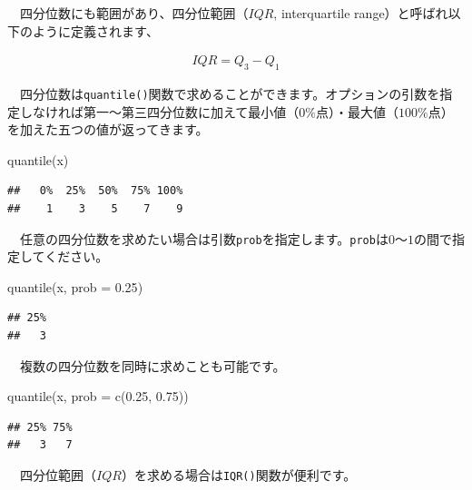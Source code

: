 \documentclass[
  12pt,
]{book}
\newenvironment{Shaded}{\begin{snugshade}}{\end{snugshade}}
\newcommand{\AttributeTok}[1]{\textcolor[rgb]{0.77,0.63,0.00}{#1}}
\newcommand{\FloatTok}[1]{\textcolor[rgb]{0.00,0.00,0.81}{#1}}
\newcommand{\FunctionTok}[1]{\textcolor[rgb]{0.00,0.00,0.00}{#1}}
\newcommand{\NormalTok}[1]{#1}
\begin{document}
　四分位数にも範囲があり、四分位範囲（\(IQR\), interquartile range）と呼ばれ以下のように定義されます、

\begin{align}
  IQR = Q_3 - Q_1 \label{eq:IQR}
\end{align}

　四分位数は\texttt{quantile()}関数で求めることができます。オプションの引数を指定しなければ第一〜第三四分位数に加えて最小値（\(0\%\mbox{点}\)）・最大値（\(100\%\mbox{点}\)）を加えた五つの値が返ってきます。

\begin{Shaded}
\begin{Highlighting}[numbers=left,,]
\FunctionTok{quantile}\NormalTok{(x)}
\end{Highlighting}
\end{Shaded}

\begin{verbatim}
##   0%  25%  50%  75% 100% 
##    1    3    5    7    9
\end{verbatim}

　任意の四分位数を求めたい場合は引数\texttt{prob}を指定します。\texttt{prob}は\(0\)〜\(1\)の間で指定してください。

\begin{Shaded}
\begin{Highlighting}[numbers=left,,]
\FunctionTok{quantile}\NormalTok{(x, }\AttributeTok{prob =} \FloatTok{0.25}\NormalTok{)}
\end{Highlighting}
\end{Shaded}

\begin{verbatim}
## 25% 
##   3
\end{verbatim}

　複数の四分位数を同時に求めことも可能です。

\begin{Shaded}
\begin{Highlighting}[numbers=left,,]
\FunctionTok{quantile}\NormalTok{(x, }\AttributeTok{prob =} \FunctionTok{c}\NormalTok{(}\FloatTok{0.25}\NormalTok{, }\FloatTok{0.75}\NormalTok{))}
\end{Highlighting}
\end{Shaded}

\begin{verbatim}
## 25% 75% 
##   3   7
\end{verbatim}

　四分位範囲（\(IQR\)）を求める場合は\texttt{IQR()}関数が便利です。
\end{document}
